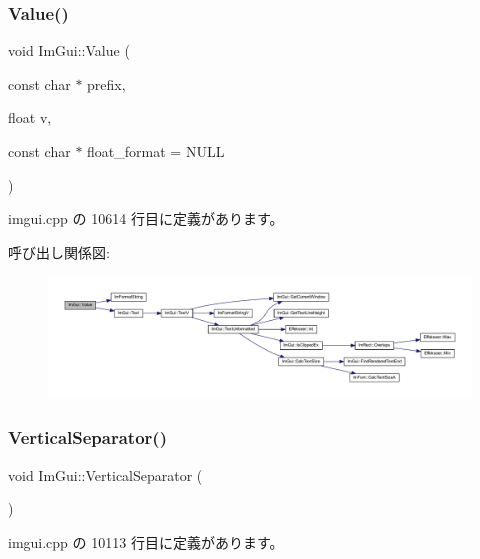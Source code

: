 \subsubsection{\texorpdfstring{Value()}{Value()}\hspace{0.1cm}{\footnotesize\ttfamily [4/4]}}
{\footnotesize\ttfamily void Im\+Gui\+::\+Value (\begin{DoxyParamCaption}\item[{const char $\ast$}]{prefix,  }\item[{float}]{v,  }\item[{const char $\ast$}]{float\+\_\+format = {\ttfamily NULL} }\end{DoxyParamCaption})}



 imgui.\+cpp の 10614 行目に定義があります。

呼び出し関係図\+:\nopagebreak
\begin{figure}[H]
\begin{center}
\leavevmode
\includegraphics[width=350pt]{namespace_im_gui_a0c8b87438082a1d0a46ae2a76090ca16_cgraph}
\end{center}
\end{figure}
\mbox{\label{namespace_im_gui_ae60f7b8ece8808c477796e6594c8d796}} 
\subsubsection{\texorpdfstring{Vertical\+Separator()}{VerticalSeparator()}}
{\footnotesize\ttfamily void Im\+Gui\+::\+Vertical\+Separator (\begin{DoxyParamCaption}{ }\end{DoxyParamCaption})}



 imgui.\+cpp の 10113 行目に定義があります。

